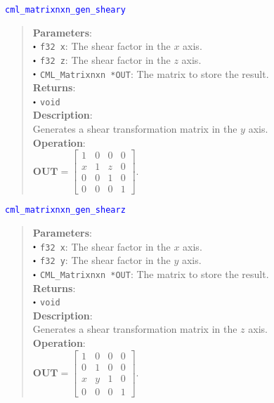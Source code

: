 \documentclass[a4paper,oneside,8pt]{extarticle}
\newcommand{\function}[1]{
  \noindent\textcolor{blue}{\texttt{#1}}
  \vspace{-0.3em}
}
\renewcommand{\dot}{\raisebox{0.3ex}{\scalebox{0.6}{$\bullet$}}}
\theoremstyle{definition}
\begin{document}
\function{cml\_matrixnxn\_gen\_sheary}
\begin{quote}
  \textbf{Parameters}: \\
  $\dot$ \texttt{f32 x}: The shear factor in the $x$ axis. \\
  $\dot$ \texttt{f32 z}: The shear factor in the $z$ axis. \\
  $\dot$ \texttt{CML\_Matrixnxn *OUT}: The matrix to store the result. \\
  \textbf{Returns}: \\
  $\dot$ \texttt{void} \\

  \vspace{-0.75em}
  \textbf{Description}: \\
  Generates a shear transformation matrix in the $y$ axis. \\

  \vspace{-0.75em}
  \textbf{Operation}: \\
  $\mathbf{OUT} = \begin{bmatrix}
  1 & 0 & 0 & 0 \\
  x & 1 & z & 0 \\
  0 & 0 & 1 & 0 \\
  0 & 0 & 0 & 1
  \end{bmatrix}$. \\
\end{quote}

\function{cml\_matrixnxn\_gen\_shearz}
\begin{quote}
  \textbf{Parameters}: \\
  $\dot$ \texttt{f32 x}: The shear factor in the $x$ axis. \\
  $\dot$ \texttt{f32 y}: The shear factor in the $y$ axis. \\
  $\dot$ \texttt{CML\_Matrixnxn *OUT}: The matrix to store the result. \\
  \textbf{Returns}: \\
  $\dot$ \texttt{void} \\

  \vspace{-0.75em}
  \textbf{Description}: \\
  Generates a shear transformation matrix in the $z$ axis. \\

  \vspace{-0.75em}
  \textbf{Operation}: \\
  $\mathbf{OUT} = \begin{bmatrix}
  1 & 0 & 0 & 0 \\
  0 & 1 & 0 & 0 \\
  x & y & 1 & 0 \\
  0 & 0 & 0 & 1
  \end{bmatrix}$. \\
\end{quote}
\end{document}
